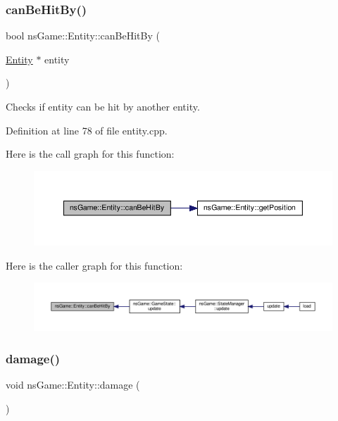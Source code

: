 \subsubsection{\texorpdfstring{can\+Be\+Hit\+By()}{canBeHitBy()}}
{\footnotesize\ttfamily bool ns\+Game\+::\+Entity\+::can\+Be\+Hit\+By (\begin{DoxyParamCaption}\item[{\hyperlink{structns_game_1_1_entity}{Entity} $\ast$}]{entity }\end{DoxyParamCaption})}



Checks if entity can be hit by another entity. 



Definition at line 78 of file entity.\+cpp.

Here is the call graph for this function\+:\nopagebreak
\begin{figure}[H]
\begin{center}
\leavevmode
\includegraphics[width=350pt]{structns_game_1_1_entity_ab5e14a11c0e89dce65f14366989a03b9_cgraph}
\end{center}
\end{figure}
Here is the caller graph for this function\+:\nopagebreak
\begin{figure}[H]
\begin{center}
\leavevmode
\includegraphics[width=350pt]{structns_game_1_1_entity_ab5e14a11c0e89dce65f14366989a03b9_icgraph}
\end{center}
\end{figure}
\mbox{\label{structns_game_1_1_entity_a7a39068f9b48d1ec3fc5ef881e142b55}} 
\subsubsection{\texorpdfstring{damage()}{damage()}}
{\footnotesize\ttfamily void ns\+Game\+::\+Entity\+::damage (\begin{DoxyParamCaption}{ }\end{DoxyParamCaption})}



